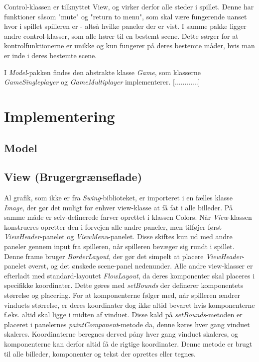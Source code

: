 \documentclass{report}
\begin{document}
Control-klassen er tilknyttet View, og virker derfor alle steder i spillet. Denne har funktioner såsom "mute" og "return to menu", som skal være fungerende uanset hvor i spillet spilleren er - altså hvilke paneler der er vist. I samme pakke ligger andre control-klasser, som alle hører til en bestemt scene. Dette sørger for at kontrolfunktionerne er unikke og kun fungerer på deres bestemte måder, hvis man er inde i deres bestemte scene.

I \textit{Model}-pakken findes den abstrakte klasse \textit{Game}, som klasserne \textit{GameSingleplayer} og \textit{GameMultiplayer} implementerer. [............]


\section{Implementering}

\subsection{Model}

\subsection{View (Brugergrænseflade)}
Al grafik, som ikke er fra \textit{Swing}-biblioteket, er importeret i en fælles klasse \textit{Image}, der gør det muligt for enhver view-klasse at få fat i alle billeder. På samme måde er selv-definerede farver oprettet i klassen Colors.
Når \textit{View}-klassen konstrueres opretter den i forvejen alle andre paneler, men tilføjer først \textit{ViewHeader}-panelet og \textit{ViewMenu}-panelet. Disse skiftes kun ud med andre paneler gennem input fra spilleren, når spilleren bevæger sig rundt i spillet. Denne frame bruger \textit{BorderLayout}, der gør det simpelt at placere \textit{ViewHeader}-panelet øverst, og det ønskede scene-panel nedenunder. Alle andre view-klasser er efterladt med standard-layoutet \textit{FlowLayout}, da deres komponenter skal placeres i specifikke koordinater. Dette gøres med \textit{setBounds} der definerer komponentets størrelse og placering. For at komponenterne følger med, når spilleren ændrer vinduets størrelse, er deres koordinater dog ikke altid bevaret hvis komponenterne f.eks. altid skal ligge i midten af vinduet. Disse kald på \textit{setBounds}-metoden er placeret i panelernes \textit{paintComponent}-metode da, denne køres hver gang vinduet skaleres. Koordinaterne beregnes derved påny hver gang vinduet skaleres, og komponenterne kan derfor altid få de rigtige koordinater. Denne metode er brugt til alle billeder, komponenter og tekst der oprettes eller tegnes.
\end{document}
